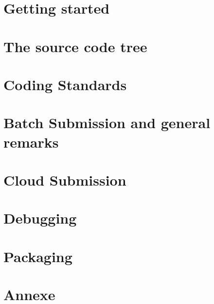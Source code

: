 \documentclass[11pt,a4paper]{report}
\begin{document}
%
%
\chapter{Getting started}
\label{ch:start}



%
%
\chapter{The source code tree}
\label{ch:tree}



%
%
\chapter{Coding Standards}
\label{ch:CS}


%
%
\chapter{Batch Submission and general remarks}
\label{ch:Batch}


%
%
\chapter{Cloud Submission}
\label{ch:Cloud}


%
\chapter{Debugging}
\label{ch:Debug}


%
\chapter{Packaging}
\label{ch:package}



%
%
\chapter{Annexe}
\label{ch:Annexe}




\
\end{document}
